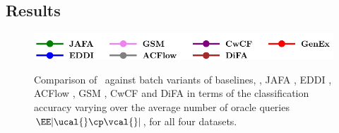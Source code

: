 \documentclass[letterpaper]{article}
\renewcommand{\cite}{\citep}
\begin{document}


\subsection{Results}
\begin{figure}[t]
    \centering
    \includegraphics[width=0.45\linewidth]{FIG/legend.pdf}\\
 \hspace{1mm}
\hspace{1mm}
\hspace{1mm}
\caption{Comparison  of \our\ against batch variants of baselines, \ie, JAFA \cite{jafa}, EDDI \cite{eddi}, ACFlow \cite{acflow}, GSM \cite{gsm}, CwCF \cite{cwcf} and DiFA \cite{difa} in terms of the classification accuracy varying over the average number of oracle queries $\EE|\ucal{} \cp \vcal{}|$, for all four datasets.}
\label{fig:main}
\end{figure}
\end{document}
